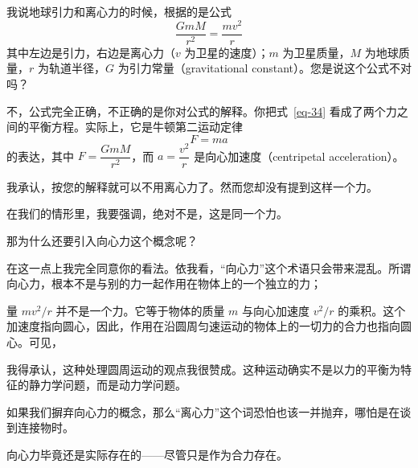 \begin{dialogue}
\stdb 我说地球引力和离心力的时候，根据的是公式
\begin{equation}%
\frac{GmM}{r^{2}} = \frac{mv^{2}}{r}
\label{eq-34}
\end{equation}
其中左边是引力，右边是离心力（$v$ 为卫星的速度）；$m$ 为卫星质量，$M$ 为地球质量，$r$ 为轨道半径，$G$ 为引力常量（gravitational constant）。您是说这个公式不对吗？

\tchr 不，公式完全正确，不正确的是你对公式的解释。你把式~\eqref{eq-34} 看成了两个力之间的平衡方程。实际上，它是牛顿第二运动定律
\begin{equation}%
F = ma
\tag{34a}
\label{eq-34a}
\end{equation}
的表达，其中 $F=\dfrac{GmM}{r^{2}}$，而 $a=\dfrac{v^{2}}{r}$ 是向心加速度（centripetal acceleration）。

\stdb 我承认，按您的解释就可以不用离心力了。然而您却没有提到这样一个力。

\tchr 在我们的情形里，我要强调，绝对不是，这是同一个力。

\stdb 那为什么还要引入向心力这个概念呢？

\tchr 在这一点上我完全同意你的看法。依我看，“向心力”这个术语只会带来混乱。所谓向心力，根本不是与别的力一起作用在物体上的一个独立的力；

量 $mv^{2}/r$ 并不是一个力。它等于物体的质量 $m$ 与向心加速度 $v^{2}/r$ 的乘积。这个加速度指向圆心，因此，作用在沿圆周匀速运动的物体上的一切力的合力也指向圆心。可见，

\stdb 我得承认，这种处理圆周运动的观点我很赞成。这种运动确实不是以力的平衡为特征的静力学问题，而是动力学问题。

\stda 如果我们摒弃向心力的概念，那么“离心力”这个词恐怕也该一并抛弃，哪怕是在谈到连接物时。

\tchr {}向心力毕竟还是实际存在的——尽管只是作为合力存在。


\end{dialogue}
